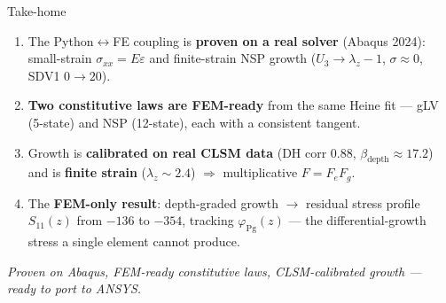 \documentclass[aspectratio=169,xcolor=dvipsnames]{beamer}
\begin{document}
\begin{frame}{Take-home}
\begin{enumerate}
  \item The Python$\leftrightarrow$FE coupling is \textbf{proven on a real solver}
    (Abaqus 2024): small-strain $\sigma_{xx}=E\varepsilon$ and finite-strain NSP growth
    ($U_3\to\lambda_z-1$, $\sigma\approx0$, SDV1 $0\to20$).
  \item \textbf{Two constitutive laws are FEM-ready} from the same Heine fit — gLV (5-state) and
    NSP (12-state), each with a consistent tangent.
  \item Growth is \textbf{calibrated on real CLSM data} (DH corr $0.88$, $\beta_{\text{depth}}\approx17.2$)
    and is \textbf{finite strain} ($\lambda_z\!\sim\!2.4$) $\Rightarrow$ multiplicative $F=F_e F_g$.
  \item The \textbf{FEM-only result}: depth-graded growth $\to$ residual stress profile
    $S_{11}(z)$ from $-136$ to $-354$, tracking $\varphi_{\text{Pg}}(z)$ — the differential-growth
    stress a single element cannot produce.
\end{enumerate}
\vspace{0.5em}
\centering\textit{Proven on Abaqus, FEM-ready constitutive laws, CLSM-calibrated growth —
ready to port to ANSYS.}
\end{frame}
\end{document}
